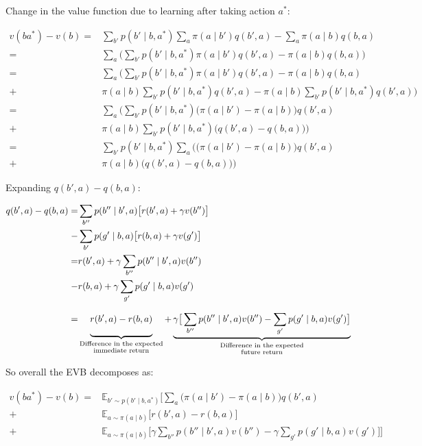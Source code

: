 \documentclass{article}
\begin{document}
    
Change in the value function due to learning after taking action $a^*$:

\begin{align}
v(ba^*)-v(b)=&\sum_{b'}p(b'\mid b, a^*)\sum_a \pi(a\mid b')q(b', a)-\sum_{a} \pi(a\mid b)q(b,a)\\
=&\sum_a\big(\sum_{b'}p(b'\mid b, a^*) \pi(a\mid b')q(b', a)-\pi(a\mid b)q(b,a)\big) \nonumber \\
=&\sum_a\big(\sum_{b'}p(b'\mid b, a^*) \pi(a\mid b')q(b', a)-\pi(a\mid b)q(b,a) \nonumber \\
+&\pi(a\mid b)\sum_{b'}p(b'\mid b, a^*)q(b', a) - \pi(a\mid b)\sum_{b'}p(b'\mid b, a^*)q(b', a)\big) \nonumber \\
=&\sum_a\big(\sum_{b'}p(b'\mid b, a^*)\big(\pi(a\mid b')-\pi(a\mid b)\big)q(b',a) \nonumber \\
+&\pi(a\mid b)\sum_{b'}p(b'\mid b, a^*)\big(q(b', a) - q(b, a)\big)\big)\nonumber \\
=&\sum_{b'}p(b'\mid b, a^*)\sum_a\big(\big(\pi(a\mid b')-\pi(a\mid b)\big)q(b',a) \nonumber \\
+&\pi(a\mid b)\big(q(b', a) - q(b, a)\big)\big) \nonumber
\end{align}

Expanding $q(b', a) - q(b, a)$:

\begin{align}
q(b', a)-q(b, a)=&\sum_{b''}p(b''\mid b', a)\big[r(b',a) + \gamma v(b'')\big]\\
-&\sum_{b'}p(g'\mid b, a)\big[r(b,a) + \gamma v(g')\big]\nonumber\\
=& r(b',a) + \gamma \sum_{b''}p(b''\mid b', a)v(b'')\nonumber \\
-& r(b,a) + \gamma \sum_{g'}p(g'\mid b, a)v(g')\nonumber \\
=& \underbrace{\vphantom{ \left(\frac{a^{\frac{0.3}{`}}}{b}\right)} r(b',a) - r(b,a)}_{\substack{\text{Difference in the expected} \\ \text{immediate return}}} + \underbrace{\gamma \big[ \sum_{b''}p(b''\mid b', a)v(b'') - \sum_{g'}p(g'\mid b, a)v(g') \big]}_{\substack{\text{Difference in the expected} \\ \text{future return}}}\nonumber
\end{align}

So overall the EVB decomposes as:

\begin{align}
    v(ba^*)-v(b) =& \mathbb{E}_{b'\sim p(b'\mid b, a^*)}\Big[\sum_a \big(\pi(a\mid b')-\pi(a\mid b)\big)q(b',a) \\
    +& \mathbb{E}_{a\sim \pi(a\mid b)}\big[r(b',a) - r(b,a)\big] \nonumber \\ 
    +& \mathbb{E}_{a\sim \pi(a\mid b)}\big[\gamma \sum_{b''}p(b''\mid b', a)v(b'') - \gamma \sum_{g'}p(g'\mid b, a)v(g') \big] \Big] \nonumber
\end{align}
\end{document}
